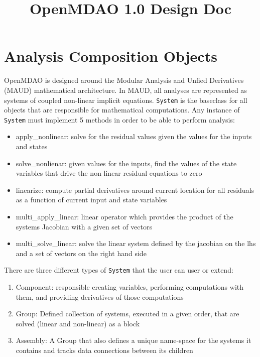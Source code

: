 \documentclass[12pt]{article}
\title {OpenMDAO 1.0 Design Doc}
\newcommand{\classname}[1]{\texttt{#1}}
\begin{document}
\maketitle

\section{Analysis Composition Objects}

OpenMDAO is designed around the Modular Analysis and Unfied Derivatives (MAUD) mathematical
architecture. In MAUD, all analyses are represented as systems of coupled non-linear implicit equations.
\classname{System} is the baseclass for all objects that are responsible for mathematical computations.
Any instance of \classname{System} must implement 5 methods in order to be able to perform
analysis:

\begin{itemize}
    \item apply\_nonlinear: solve for the residual values given the values for
    the inputs and states
    \item solve\_nonlienar: given values for the inputs, find the values of the
    state variables that drive the non linear residual equations to zero
    \item linearize: compute partial derivatives around current location for all
    residuals as a function of current input and state variables
    \item multi\_apply\_linear: linear operator which provides the product of the systems
    Jacobian with a given set of vectors
    \item multi\_solve\_linear: solve the linear system defined by the jacobian on the
    lhs and a set of vectors on the right hand side
\end{itemize}

There are three different types of \classname{System} that the user can user or extend:
\begin{enumerate}
    \item Component: responsible creating variables, performing computations with them, and providing derivatives of those computations
    \item Group: Defined collection of systems, executed in a given order, that are solved (linear and non-linear) as a block
    \item Assembly: A Group that also defines a unique name-space for the systems it contains and tracks data connections between its children
\end{enumerate}
\end{document}
